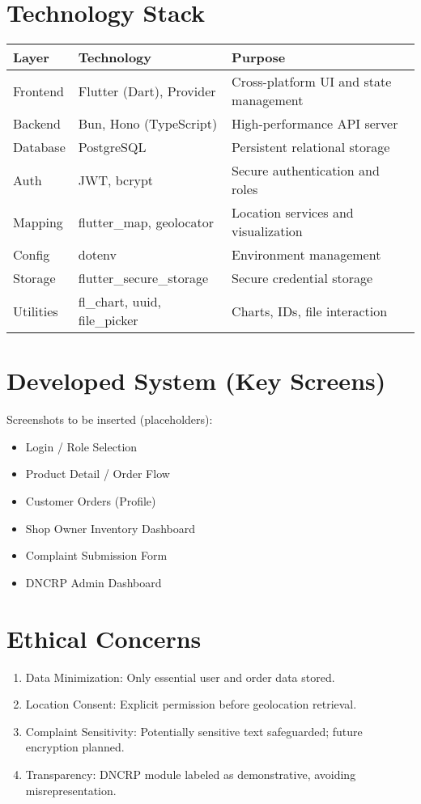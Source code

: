 \documentclass[12pt,a4paper]{article}
\begin{document}
\section{Technology Stack}
\begin{longtable}{p{3cm} p{4cm} p{8cm}}
\toprule
Layer & Technology & Purpose \\
\midrule
Frontend & Flutter (Dart), Provider & Cross-platform UI and state management \\
Backend & Bun, Hono (TypeScript) & High-performance API server \\
Database & PostgreSQL & Persistent relational storage \\
Auth & JWT, bcrypt & Secure authentication and roles \\
Mapping & flutter\_map, geolocator & Location services and visualization \\
Config & dotenv & Environment management \\
Storage & flutter\_secure\_storage & Secure credential storage \\
Utilities & fl\_chart, uuid, file\_picker & Charts, IDs, file interaction \\
\bottomrule
\end{longtable}

\section{Developed System (Key Screens)}
Screenshots to be inserted (placeholders):
\begin{itemize}
  \item Login / Role Selection
  \item Product Detail / Order Flow
  \item Customer Orders (Profile)
  \item Shop Owner Inventory Dashboard
  \item Complaint Submission Form
  \item DNCRP Admin Dashboard
\end{itemize}

\section{Ethical Concerns}
\begin{enumerate}
  \item Data Minimization: Only essential user and order data stored.
  \item Location Consent: Explicit permission before geolocation retrieval.
  \item Complaint Sensitivity: Potentially sensitive text safeguarded; future encryption planned.
  \item Transparency: DNCRP module labeled as demonstrative, avoiding misrepresentation.
\end{enumerate}
\end{document}
